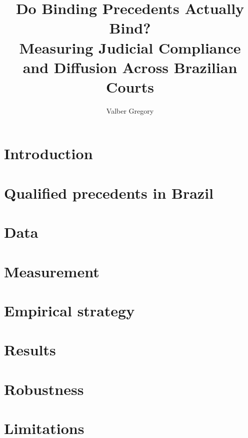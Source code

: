 \documentclass[11pt,a4paper]{article}
\title{Do Binding Precedents Actually Bind?\\ Measuring Judicial Compliance and Diffusion Across Brazilian Courts}
\author{Valber Gregory}
\date{}
\begin{document}
\maketitle

\begin{abstract}
\end{abstract}

\section{Introduction}

\section{Qualified precedents in Brazil}

\section{Data}

\section{Measurement}

\section{Empirical strategy}

\section{Results}
% 

\section{Robustness}

\section{Limitations}
\end{document}
